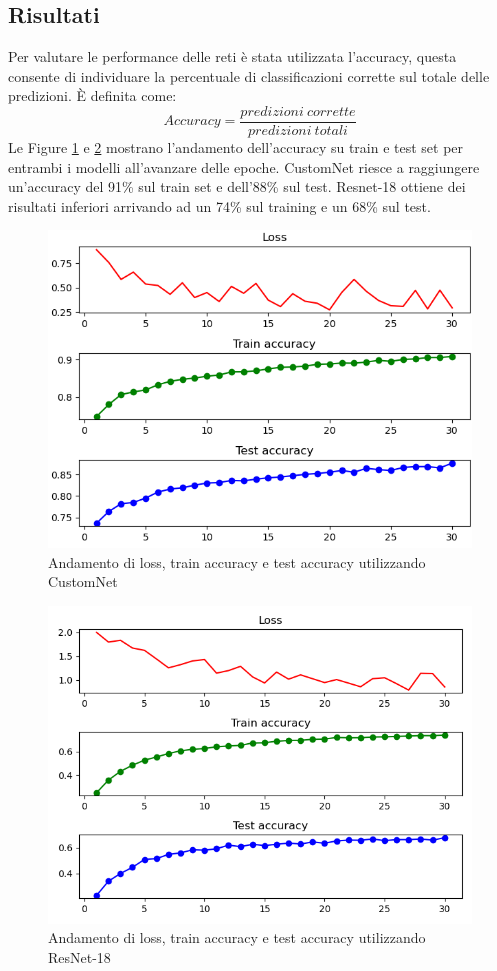 \subsection*{Risultati}
Per valutare le performance delle reti è stata utilizzata l'accuracy, questa consente di individuare la percentuale di classificazioni corrette sul totale delle predizioni. \`{E} definita come:$$Accuracy = \frac{predizioni\: corrette}{predizioni\: totali}$$ Le Figure \ref{fig9:customNet_score} e \ref{fig10:resNet_score} mostrano l'andamento dell'accuracy su train e test set per entrambi i modelli all'avanzare delle epoche. CustomNet riesce a raggiungere un'accuracy del 91\% sul train set e dell'88\% sul test. Resnet-18 ottiene dei risultati inferiori arrivando ad un 74\% sul training e un 68\% sul test.
\begin{figure}[!hbt]
    \centering
    \includegraphics[width=\columnwidth]{images/CustomNetScore1bis.png}
    \caption{Andamento di loss, train accuracy e test accuracy utilizzando CustomNet}
    \label{fig9:customNet_score}
\end{figure}
\begin{figure}[!hbt]
    \centering
    \includegraphics[width=\columnwidth]{images/ResNetScore.png}
    \caption{Andamento di loss, train accuracy e test accuracy utilizzando ResNet-18}
    \label{fig10:resNet_score}
\end{figure}\par
